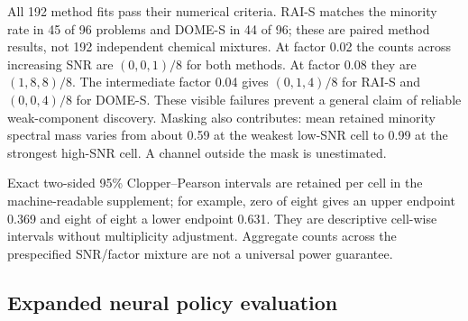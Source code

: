 All 192 method fits pass their numerical criteria. RAI-S matches the minority
rate in 45 of 96 problems and DOME-S in 44 of 96; these are paired method
results, not 192 independent chemical mixtures. At factor 0.02 the counts
across increasing SNR are $(0,0,1)/8$ for both methods. At factor 0.08 they
are $(1,8,8)/8$. The intermediate factor 0.04 gives $(0,1,4)/8$ for RAI-S
and $(0,0,4)/8$ for DOME-S. These visible failures prevent a general claim
of reliable weak-component discovery. Masking also contributes: mean retained
minority spectral mass varies from about 0.59 at the weakest low-SNR cell to
0.99 at the strongest high-SNR cell. A channel outside the mask is unestimated.

Exact two-sided 95\% Clopper--Pearson intervals are retained per cell in the
machine-readable supplement; for example, zero of eight gives an upper
endpoint 0.369 and eight of eight a lower endpoint 0.631. They are descriptive
cell-wise intervals without multiplicity adjustment. Aggregate counts across
the prespecified SNR/factor mixture are not a universal power guarantee.


\subsection{Expanded neural policy evaluation}

